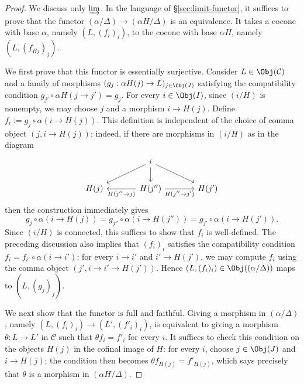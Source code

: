 \begin{proof}
	We discuss only $\varinjlim$. In the language of
	\S\ref{sec:limit-functor}, it suffices to prove that the functor
	$(\alpha/\Delta) \to (\alpha H / \Delta)$ is an equivalence. It takes a
	cocone with base $\alpha$, namely $(L, (f_i)_i)$, to the cocone with base
	$\alpha H$, namely $(L, (f_{Hj})_j)$.

	We first prove that this functor is essentially surjective. Consider
	$L \in \Obj(\mathcal{C})$ and a family of morphisms
	$(g_j: \alpha H(j) \to L)_{j \in \Obj(J)}$ satisfying the compatibility
	condition $g_{j'} \circ \alpha H(j \to j') = g_j$. For every
	$i \in \Obj(I)$, since $(i/H)$ is nonempty, we may choose $j$ and a
	morphism $i \to H(j)$. Define
	$f_i := g_j \circ \alpha(i \to H(j))$. This definition is independent of
	the choice of comma object $(j,i \to H(j))$: indeed, if there are morphisms
	in $(i/H)$ as in the diagram
	\[\begin{tikzcd}[column sep=large]
		& i \arrow[ld] \arrow[d] \arrow[rd] & \\
		H(j) & H(j'') \arrow[l, "{H(j'' \to j)}"] \arrow[r, "{H(j'' \to j')}"'] & H(j')
	\end{tikzcd}\]
	then the construction immediately gives
	\[ g_j \circ \alpha(i\to H(j))
	= g_{j''} \circ \alpha(i\to H(j''))
	= g_{j'} \circ \alpha(i\to H(j')). \]
	Since $(i/H)$ is connected, this suffices to show that $f_i$ is
	well-defined. The preceding discussion also implies that $(f_i)_i$
	satisfies the compatibility condition
	$f_i=f_{i'}\circ\alpha(i\to i')$: for every $i \to i'$ and
	$i' \to H(j')$, we may compute $f_i$ using the comma object
	$(j',i \to i' \to H(j'))$. Hence
	$(L, (f_i)_i) \in \Obj((\alpha/\Delta))$ maps to $(L, (g_j)_j)$.

	We next show that the functor is full and faithful. Giving a morphism in
	$(\alpha/\Delta)$, namely
	$(L, (f_i)_i) \to (L', (f'_i)_i)$, is equivalent to giving a morphism
	$\theta: L \to L'$ in $\mathcal{C}$ such that $\theta f_i = f'_i$ for every
	$i$. It suffices to check this condition on the objects $H(j)$ in the
	cofinal image of $H$: for every $i$, choose $j \in \Obj(J)$ and
	$i \to H(j)$; the condition then becomes
	$\theta f_{H(j)} = f'_{H(j)}$, which says precisely that $\theta$ is a
	morphism in $(\alpha H / \Delta)$.
\end{proof}

